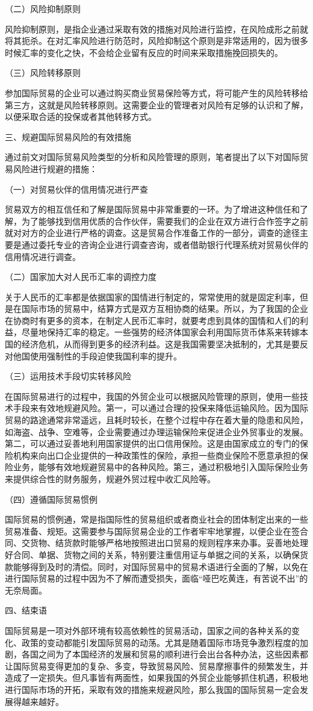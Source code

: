 （二）风险抑制原则

风险抑制原则，是指企业通过采取有效的措施对风险进行监控，在风险成形之前就将其扼杀。在对汇率风险进行防范时，风险抑制这个原则是非常适用的，因为很多时候汇率的变化之快，不会给企业留有反应的时间来采取措施挽回损失的。

（三）风险转移原则

参加国际贸易的企业可以通过购买商业贸易保险等方式，将可能产生的风险转移给第三方，这就是风险转移原则。这需要企业的管理者对风险有足够的认识和了解，以便采取合适的投保或者其他转移方式。

三、规避国际贸易风险的有效措施

通过前文对国际贸易风险类型的分析和风险管理的原则，笔者提出了以下对国际贸易风险进行规避的措施：

（一）对贸易伙伴的信用情况进行严查

贸易双方的相互信任和了解是国际贸易中非常重要的一环。为了增进这种信任和了解，为了能够找到信用优质的合作伙伴，需要我们的企业在双方进行合作签字之前就对对方的企业进行严格的调查。这是贸易合作准备工作的一部分，调查的途径主要是通过委托专业的咨询企业进行调查咨询，或者借助银行代理系统对贸易伙伴的信用情况进行调查。

（二）国家加大对人民币汇率的调控力度

关于人民币的汇率都是依据国家的国情进行制定的，常常使用的就是固定利率，但是在国际市场的贸易中，结算方式是双方互相协商的结果。所以，为了我国的企业在协商时有更多的资本，在制定人民币汇率时，就要考虑到具体的国情和人们的利益，尽量地保持汇率的稳定。一些强势的经济体国家会利用国际货币体系来转嫁本国的经济危机，从而得到更多的经济利益。这是我国需要坚决抵制的，尤其是要反对他国使用强制性的手段迫使我国利率的提升。

（三）运用技术手段切实转移风险

在国际贸易进行的过程中，我国的外贸企业可以根据风险管理的原则，使用一些技术手段来有效地规避风险。第一，可以通过合理的投保来降低运输风险。因为国际贸易的路途通常非常遥远，且耗时较长，在整个过程中存在着大量的隐患和风险，如海盗、战争、空难等，企业需要通过办理运输保险来促进企业外贸事业的发展。第二，可以通过妥善地利用国家提供的出口信用保险。这是由国家成立的专门的保险机构来向出口企业提供的一种政策性的保险，承担一些商业保险不愿意承担的保险业务，能够有效地规避贸易中的各种风险。第三，通过积极地引入国际保险业务来提供综合性的财务服务，规避外贸过程中收汇风险等。

（四）遵循国际贸易惯例

国际贸易的惯例通，常是指国际性的贸易组织或者商业社会的团体制定出来的一些贸易准备、规矩。这需要参与国际贸易企业的工作者牢牢地掌握，以便企业在签合同、交货物、结货款时能够严格地按照进出口贸易的规则程序来办事。妥善地处理好合同、单据、货物之间的关系，特别要注重信用证与单据之间的关系，以确保货款能够得到及时的清偿。同时，对国际贸易中的贸易术语进行全面的了解，以免在进行国际贸易的过程中因为不了解而遭受损失，面临“哑巴吃黄连，有苦说不出”的无奈局面。

四、结束语

国际贸易是一项对外部环境有较高依赖性的贸易活动，国家之间的各种关系的变化、政策的变动都能引发国际贸易的动荡。尤其是随着国际市场竞争激烈程度的加剧，各国之间为了本国经济的发展和贸易的顺利进行会出台各种办法，这些因素都让国际贸易变得更加的复杂、多变，导致贸易风险、贸易摩擦事件的频繁发生，并造成了一定损失。但凡事皆有两面性，如果我国的外贸企业能够抓住机遇，积极地进行国际市场的开拓，采取有效的措施来规避风险，那么我国的国际贸易一定会发展得越来越好。